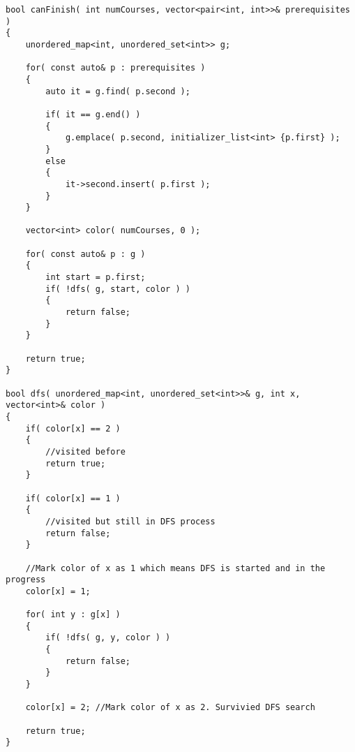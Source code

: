 \setcounter{lstlisting}{0}
\begin{lstlisting}[style=customc]
bool canFinish( int numCourses, vector<pair<int, int>>& prerequisites )
{
    unordered_map<int, unordered_set<int>> g;

    for( const auto& p : prerequisites )
    {
        auto it = g.find( p.second );

        if( it == g.end() )
        {
            g.emplace( p.second, initializer_list<int> {p.first} );
        }
        else
        {
            it->second.insert( p.first );
        }
    }

    vector<int> color( numCourses, 0 );

    for( const auto& p : g )
    {
        int start = p.first;
        if( !dfs( g, start, color ) )
        {
            return false;
        }
    }

    return true;
}

bool dfs( unordered_map<int, unordered_set<int>>& g, int x, vector<int>& color )
{
    if( color[x] == 2 )
    {
        //visited before
        return true;
    }

    if( color[x] == 1 )
    {
        //visited but still in DFS process
        return false;
    }

    //Mark color of x as 1 which means DFS is started and in the progress
    color[x] = 1;

    for( int y : g[x] )
    {
        if( !dfs( g, y, color ) )
        {
            return false;
        }
    }

    color[x] = 2; //Mark color of x as 2. Survivied DFS search

    return true;
}
\end{lstlisting}
